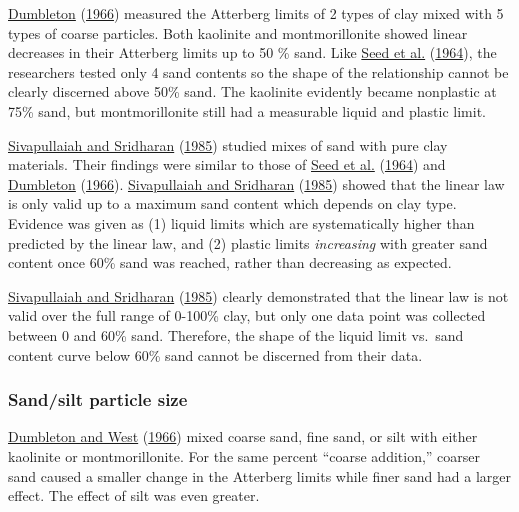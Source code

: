 \documentclass[
  letterpaper,
  openany]{book}
\begin{document}
\protect\hyperlink{ref-Dumbleton1966a}{Dumbleton} (\protect\hyperlink{ref-Dumbleton1966a}{1966}) measured the Atterberg limits of 2 types of clay mixed with 5 types of coarse particles.
Both kaolinite and montmorillonite showed linear decreases in their Atterberg limits up to 50 \% sand.
Like \protect\hyperlink{ref-Seed1964a}{Seed et al.} (\protect\hyperlink{ref-Seed1964a}{1964}), the researchers tested only 4 sand contents so the shape of the relationship cannot be clearly discerned above 50\% sand.
The kaolinite evidently became nonplastic at 75\% sand, but montmorillonite still had a measurable liquid and plastic limit.

\protect\hyperlink{ref-Sivapullaiah1985}{Sivapullaiah and Sridharan} (\protect\hyperlink{ref-Sivapullaiah1985}{1985}) studied mixes of sand with pure clay materials.
Their findings were similar to those of \protect\hyperlink{ref-Seed1964a}{Seed et al.} (\protect\hyperlink{ref-Seed1964a}{1964}) and \protect\hyperlink{ref-Dumbleton1966a}{Dumbleton} (\protect\hyperlink{ref-Dumbleton1966a}{1966}).
\protect\hyperlink{ref-Sivapullaiah1985}{Sivapullaiah and Sridharan} (\protect\hyperlink{ref-Sivapullaiah1985}{1985}) showed that the linear law is only valid up to a maximum sand content which depends on clay type.
Evidence was given as (1) liquid limits which are systematically higher than predicted by the linear law, and (2) plastic limits \emph{increasing} with greater sand content once 60\% sand was reached, rather than decreasing as expected.

\protect\hyperlink{ref-Sivapullaiah1985}{Sivapullaiah and Sridharan} (\protect\hyperlink{ref-Sivapullaiah1985}{1985}) clearly demonstrated that the linear law is not valid over the full range of 0-100\% clay, but only one data point was collected between 0 and 60\% sand.
Therefore, the shape of the liquid limit vs.~sand content curve below 60\% sand cannot be discerned from their data.

\hypertarget{sandsilt-particle-size}{%
\subsubsection{Sand/silt particle size}\label{sandsilt-particle-size}}

\protect\hyperlink{ref-Dumbleton1966b}{Dumbleton and West} (\protect\hyperlink{ref-Dumbleton1966b}{1966}) mixed coarse sand, fine sand, or silt with either kaolinite or montmorillonite.
For the same percent ``coarse addition,'' coarser sand caused a smaller change in the Atterberg limits while finer sand had a larger effect. The effect of silt was even greater.
\end{document}
